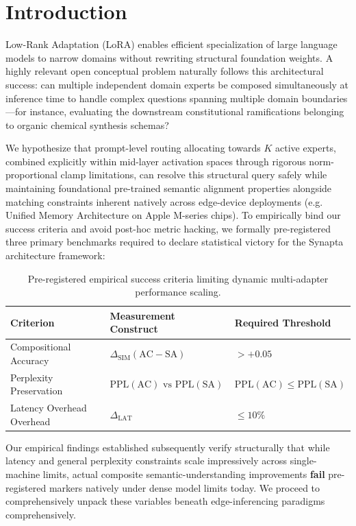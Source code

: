 \documentclass[11pt]{article}
\begin{document}
\newpage
\section{Introduction}

Low-Rank Adaptation (LoRA) enables efficient specialization of large language models to narrow domains without rewriting structural foundation weights. A highly relevant open conceptual problem naturally follows this architectural success: can multiple independent domain experts be composed simultaneously at inference time to handle complex questions spanning multiple domain boundaries---for instance, evaluating the downstream constitutional ramifications belonging to organic chemical synthesis schemas?

We hypothesize that prompt-level routing allocating towards $K$ active experts, combined explicitly within mid-layer activation spaces through rigorous norm-proportional clamp limitations, can resolve this structural query safely while maintaining foundational pre-trained semantic alignment properties alongside matching constraints inherent natively across edge-device deployments (e.g. Unified Memory Architecture on Apple M-series chips). To empirically bind our success criteria and avoid post-hoc metric hacking, we formally pre-registered three primary benchmarks required to declare statistical victory for the Synapta architecture framework:

\begin{table}[H]
\centering
\begin{tabular}{lll}
\toprule
\textbf{Criterion} & \textbf{Measurement Construct} & \textbf{Required Threshold} \\
\midrule
Compositional Accuracy & $\Delta_{\text{SIM}}(\text{AC} - \text{SA})$ & $> +0.05$ \\
Perplexity Preservation & $\text{PPL}(\text{AC}) \text{ vs } \text{PPL}(\text{SA})$ & $\text{PPL}(\text{AC}) \leq \text{PPL}(\text{SA})$ \\
Latency Overhead Overhead & $\Delta_{\text{LAT}}$ & $\leq 10\%$ \\
\bottomrule
\end{tabular}
\caption{Pre-registered empirical success criteria limiting dynamic multi-adapter performance scaling.}
\end{table}

Our empirical findings established subsequently verify structurally that while latency and general perplexity constraints scale impressively across single-machine limits, actual composite semantic-understanding improvements \textbf{fail} pre-registered markers natively under dense model limits today. We proceed to comprehensively unpack these variables beneath edge-inferencing paradigms comprehensively.
\end{document}
